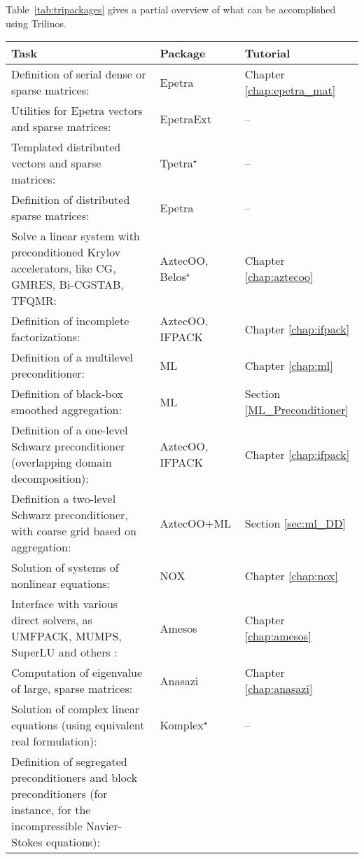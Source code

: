 Table~\ref{tab:tripackages} gives a partial overview of what can be
accomplished using Trilinos.
\begin{table}[htbp]
  \centering
  \begin{tabular}{| p{8cm} | p{2.5cm} | p{3cm} |}
    \hline
    {\bf Task} & {\bf Package} & {\bf Tutorial}\\
    \hline
    Definition of serial dense or sparse matrices: & Epetra 
    & Chapter \ref{chap:epetra_mat} \\
    Utilities for Epetra vectors and sparse matrices: & EpetraExt & -- 
    \\
    Templated distributed vectors and sparse matrices: & Tpetra$^\star$
    & -- \\
    Definition of distributed sparse matrices:& Epetra & -- \\
    Solve a linear system with preconditioned Krylov accelerators, like
    CG, GMRES, Bi-CGSTAB, TFQMR:& AztecOO, Belos$^\star$ &
    Chapter \ref{chap:aztecoo} \\
    Definition of incomplete factorizations:& AztecOO, \newline IFPACK &
    Chapter \ref{chap:ifpack} \\
    Definition of a multilevel preconditioner:& ML & Chapter
    \ref{chap:ml} \\
    Definition of black-box smoothed aggregation:& ML & Section
    \ref{ML_Preconditioner} \\
    Definition of a one-level Schwarz preconditioner (overlapping domain
    decomposition):& AztecOO, \newline IFPACK & Chapter \ref{chap:ifpack} \\
    Definition a two-level Schwarz preconditioner, with coarse grid based on
    aggregation:& AztecOO+ML & Section \ref{sec:ml_DD} \\
    Solution of  systems of nonlinear equations:& NOX & Chapter \ref{chap:nox} \\
    Interface with various direct solvers, as UMFPACK, MUMPS, SuperLU
    and others :& Amesos & Chapter \ref{chap:amesos} \\
    Computation of eigenvalue of large, sparse matrices:& Anasazi &
    Chapter \ref{chap:anasazi} 
    \\
    Solution of complex linear equations (using equivalent real formulation):&
    Komplex$^\star$ & -- \\
    Definition of segregated preconditioners and block preconditioners (for
    instance, for the incompressible Navier-Stokes equations):&

\end{tabular}
\end{table}
